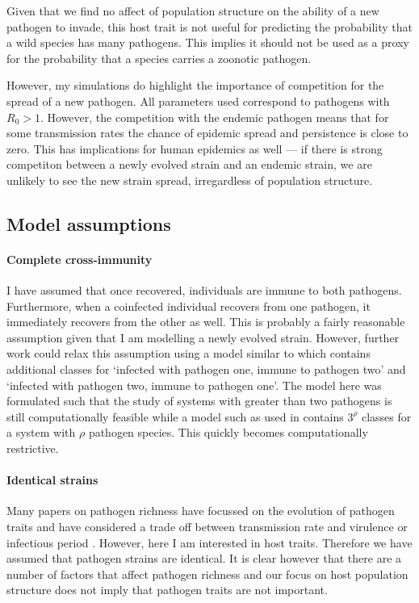 Given that we find no affect of population structure on the ability of a new pathogen to invade, this host trait is not useful for predicting the probability that a wild species has many pathogens.
This implies it should not be used as a proxy for the probability that a species carries a zoonotic pathogen.

However, my simulations do highlight the importance of competition for the spread of a new pathogen.
All parameters used correspond to pathogens with $R_0>1$.
However, the competition with the endemic pathogen means that for some transmission rates the chance of epidemic spread and persistence is close to zero.
This has implications for human epidemics as well --- if there is strong competiton between a newly evolved strain and an endemic strain, we are unlikely to see the new strain spread, irregardless of population structure.




\subsection{Model assumptions}

\paragraph{Complete cross-immunity}

I have assumed that once recovered, individuals are immune to both pathogens. 
Furthermore, when a coinfected individual recovers from one pathogen, it immediately recovers from the other as well.
This is probably a fairly reasonable assumption given that I am modelling a newly evolved strain.
However, further work could relax this assumption using a model similar to \cite{poletto2015characterising} which contains additional classes for `infected with pathogen one, immune to pathogen two' and `infected with pathogen two, immune to pathogen one'.
The model here was formulated such that the study of systems with greater than two pathogens is still computationally feasible while a model such as used in \cite{poletto2015characterising} contains $3^\rho$ classes for a system with $\rho$ pathogen species.
This quickly becomes computationally restrictive.

\paragraph{Identical strains}

Many papers on pathogen richness have focussed on the evolution of pathogen traits and have considered a trade off between transmission rate and virulence \cite{nowak1994superinfection, nowak1994superinfection} or infectious period \cite{poletto2013host}.
However, here I am interested in host traits.
Therefore we have assumed that pathogen strains are identical.
It is clear however that there are a number of factors that affect pathogen richness and our focus on host population structure does not imply that pathogen traits are not important.

